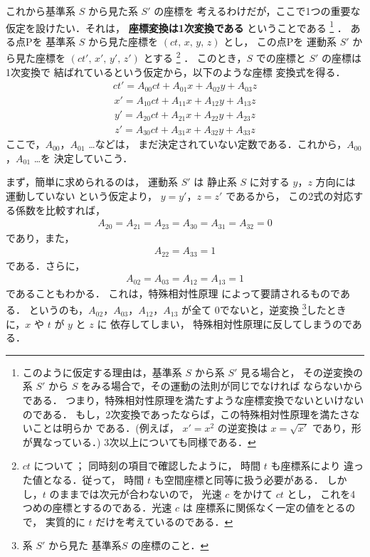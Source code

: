 これから基準系 $S$ から見た系 $S'$ の座標を
考えるわけだが，ここで1つの重要な
仮定を設けたい．それは，
\textbf{座標変換は1次変換である} ということである
\footnote{
このように仮定する理由は，基準系 $S$ から系 $S'$ 見る場合と，
その逆変換の
系 $S'$ から $S$ をみる場合で，その運動の法則が同じでなければ
ならないからである．
つまり，特殊相対性原理を満たすような座標変換でないといけないのである．
もし，2次変換であったならば，この特殊相対性原理を満たさないことは明らか
である．(例えば， $x'=x^{2}$ の逆変換は $x=\sqrt{x'}$ であり，形が異なっている．)
3次以上についても同様である．
}
．
ある点Pを
基準系 $S$ から見た座標を $(ct,\,x,\,y,\,z)$ とし，
この点Pを
運動系 $S'$ から見た座標を $(ct',\,x',\,y',\,z')$ とする
\footnote{
$ct$ について\,；\;
同時刻の項目で確認したように，
時間 $t$ も座標系により
違った値となる．従って，
時間 $t$ も空間座標と同等に扱う必要がある．
しかし，$t$ のままでは次元が合わないので，
光速 $c$ をかけて $ct$ とし，
これを4つめの座標とするのである．光速 $c$ は
座標系に関係なく一定の値をとるので，
実質的に $t$ だけを考えているのである．
}
．
このとき，$S$ での座標と $S'$ の座標は1次変換で
結ばれているという仮定から，以下のような座標
変換式を得る．
\begin{align}\label{eq:L_tr1}
ct'=A_{00}ct+A_{01}x+A_{02}y+A_{03}z
\end{align}
\begin{align}\label{eq:L_tr2}
x'=A_{10}ct+A_{11}x+A_{12}y+A_{13}z
\end{align}
\begin{align}
y'=A_{20}ct+A_{21}x+A_{22}y+A_{23}z
\end{align}
\begin{align}
z'=A_{30}ct+A_{31}x+A_{32}y+A_{33}z
\end{align}
ここで，$A_{00}$，$A_{01}$ …などは，
まだ決定されていない定数である．これから，$A_{00}$，$A_{01}$ …を
決定していこう．

\vspace{6mm}

まず，簡単に求められるのは，
運動系 $S'$ は 静止系 $S$ に対する $y$，$z$ 方向には
運動していない という仮定より， $y=y'$，$z=z'$ であるから，
この2式の対応する係数を比較すれば，
\begin{align}
A_{20}=A_{21}=A_{23}=A_{30}=A_{31}=A_{32}=0
\end{align}
であり，また，
\begin{align}
A_{22}=A_{33}=1
\end{align}
である．さらに，
\begin{align}
A_{02}=A_{03}=A_{12}=A_{13}=1
\end{align}
であることもわかる．
これは，特殊相対性原理
によって要請されるものである．
というのも，$A_{02}$，$A_{03}$，$A_{12}$，$A_{13}$ が全て
0でないと，逆変換
\footnote{
系 $S'$ から見た 基準系$S$ の座標のこと．
}したときに，$x$ や $t$ が $y$ と $z$ に
依存してしまい，
特殊相対性原理に反してしまうのである．

